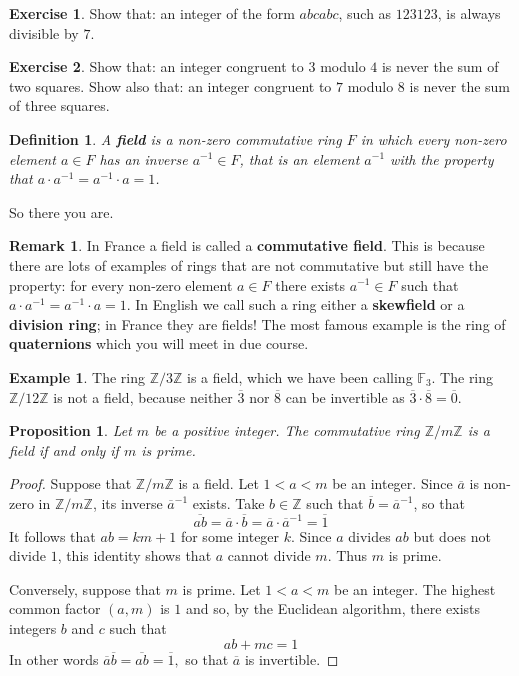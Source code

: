 \documentclass[11pt]{amsbook}
\newtheorem{definition}[theorem]{Definition}
\newtheorem{proposition}[theorem]{Proposition}
\theoremstyle{definition}
\newtheorem{rem}[theorem]{Remark}
\newtheorem{ex}[theorem]{Example}
\newtheorem{exercise}{Exercise}
\begin{document}
\begin{exercise}
Show that: an integer of the form $abcabc$, such as $123123$, is always divisible by $7$.
\end{exercise}

\begin{exercise}
Show that: an integer congruent to $3$ modulo $4$ is never the sum of two squares. Show also that: an integer congruent to $7$ modulo $8$ is never the sum of three squares.
\end{exercise}

\begin{definition} \label{fielddef} A {\bf field} is a non-zero commutative ring $F$ in which every non-zero element $a\in F$ has an inverse $a^{-1}\in F$, that is an element $a^{-1}$ with the property that $a\cdot a^{-1} = a^{-1}\cdot a = 1$.
\end{definition}

So there you are.
\begin{rem} In France a field is called a {\bf commutative field}. This is because there are lots of examples of rings that are not commutative but still have the property: for every non-zero element $a\in F$ there exists $a^{-1}\in F$ such that $a\cdot a^{-1} = a^{-1}\cdot a = 1$. In English we call such a ring either a {\bf skewfield} or a {\bf division ring}; in France they are fields! The most famous example is the ring of {\bf quaternions} which you will meet in due course.
\end{rem}

\begin{ex} The ring $\mathbb{Z}/3\mathbb{Z}$ is a field, which we have been calling $\mathbb{F}_3$. The ring $\mathbb{Z}/12\mathbb{Z}$ is not a field, because neither $\overline{3}$ nor $\overline{8}$ can be invertible as $\overline{3}\cdot \overline{8} = \overline{0}.$
\end{ex}

\begin{proposition}\label{finitefield}
Let $m$ be a positive integer. The commutative ring $\mathbb{Z}/m\mathbb{Z}$ is a field if and only if $m$ is prime.
\end{proposition}

\begin{proof}
Suppose that $\mathbb{Z}/m\mathbb{Z}$ is a field. Let $1< a < m$ be an integer. Since $\overline{a}$ is non-zero in $\mathbb{Z}/m\mathbb{Z}$, its inverse $\overline{a}^{-1}$ exists. Take $b \in \mathbb{Z}$ such that $\overline{b} = \overline{a}^{-1}$, so that $$\overline{ab} = \overline{a}\cdot \overline{b} = \overline{a}\cdot \overline{a}^{-1} = \overline{1}$$ It follows that $ab = km + 1$ for some integer $k$. Since $a$ divides $ab$ but does not divide $1$, this identity shows that $a$ cannot divide $m$. Thus $m$ is prime.

Conversely, suppose that $m$ is prime. Let $1< a < m$ be an integer. The highest common factor $(a,m)$ is $1$ and so, by the Euclidean algorithm, there exists integers $b$ and $c$ such that $$ab + mc = 1$$ In other words $\overline{a}\overline{b} = \overline{ab} = \overline{1},$ so that $\overline{a}$ is invertible. \end{proof}
\end{document}
